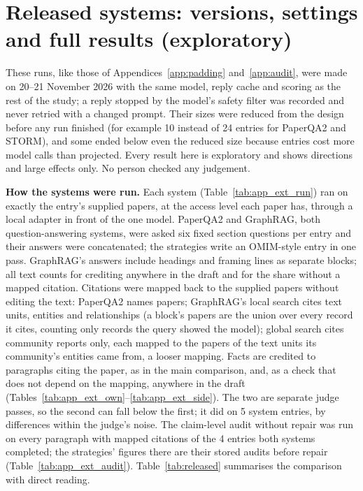 \documentclass{article} %
\begin{document}
\section{Released systems: versions, settings and full results (exploratory)}
\label{app:released}
These runs, like those of Appendices~\ref{app:padding} and~\ref{app:audit}, were made on 20--21 November 2026 with the same model, reply cache and scoring as the rest of the study; a reply stopped by the model's safety filter was recorded and never retried with a changed prompt. Their sizes were reduced from the design before any run finished (for example 10 instead of 24 entries for PaperQA2 and STORM), and some ended below even the reduced size because entries cost more model calls than projected. Every result here is exploratory and shows directions and large effects only. No person checked any judgement.

\textbf{How the systems were run.} Each system (Table~\ref{tab:app_ext_run}) ran on exactly the entry's supplied papers, at the access level each paper has, through a local adapter in front of the one model. PaperQA2 and GraphRAG, both question-answering systems, were asked six fixed section questions per entry and their answers were concatenated; the strategies write an OMIM-style entry in one pass. GraphRAG's answers include headings and framing lines as separate blocks; all text counts for crediting anywhere in the draft and for the share without a mapped citation. Citations were mapped back to the supplied papers without editing the text: PaperQA2 names papers; GraphRAG's local search cites text units, entities and relationships (a block's papers are the union over every record it cites, counting only records the query showed the model); global search cites community reports only, each mapped to the papers of the text units its community's entities came from, a looser mapping. Facts are credited to paragraphs citing the paper, as in the main comparison, and, as a check that does not depend on the mapping, anywhere in the draft (Tables~\ref{tab:app_ext_own}--\ref{tab:app_ext_side}). The two are separate judge passes, so the second can fall below the first; it did on 5 system entries, by differences within the judge's noise. The claim-level audit without repair was run on every paragraph with mapped citations of the 4 entries both systems completed; the strategies' figures there are their stored audits before repair (Table~\ref{tab:app_ext_audit}). Table~\ref{tab:released} summarises the comparison with direct reading.
\end{document}
